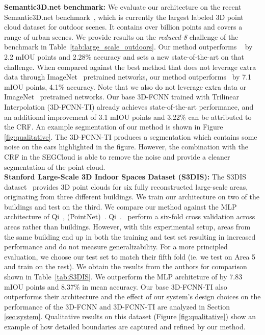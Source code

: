 \documentclass[10pt,twocolumn,letterpaper]{article}
\newcommand{\fccrf}[0]{CRF\xspace}
\newcommand{\ours}[0]{SEGCloud\xspace}
\newcommand{\threedfcnn}[0]{3D-FCNN\xspace}
\begin{document}
\textbf{Semantic3D.net benchmark:}
We evaluate our architecture on the recent Semantic3D.net benchmark~\cite{l3d}, which is currently the largest labeled 3D point cloud dataset for outdoor scenes. It contains over  billion points and covers a range of urban scenes. We provide results on the \textit{reduced-8} challenge of the benchmark in Table~\ref{tab:large_scale_outdoors}. Our method outperforms ~\cite{snapnet} by 2.2 mIOU points and 2.28\% accuracy and sets a new state-of-the-art on that challenge. When compared against the best method that does not leverage extra data through ImageNet~\cite{ILSVRC15} pretrained networks, our method outperforms~\cite{Hackel2016} by 7.1 mIOU points, 4.1\% accuracy. Note that we also do not leverage extra data or ImageNet~\cite{ILSVRC15} pretrained networks. Our base \threedfcnn trained with Trilinear Interpolation (\threedfcnn-TI) already achieves state-of-the-art performance, and an additional improvement of 3.1 mIOU points and 3.22\% can be attributed to the \fccrf. An example segmentation of our method is shown in Figure \ref{fig:qualitative}. The \threedfcnn-TI produces a segmentation which contains some noise on the cars highlighted in the figure. However, the combination with the \fccrf in the \ours is able to remove the noise and provide a cleaner segmentation of the point cloud.\\

\textbf{Stanford Large-Scale 3D Indoor Spaces Dataset (S3DIS): }The S3DIS dataset~\cite{Armeni2016} provides 3D point clouds for six fully reconstructed large-scale areas, originating from three different buildings. We train our architecture on two of the buildings and test on the third. We compare our method against the MLP architecture of Qi~\etal, (PointNet)~\cite{DBLP:journals/corr/QiSMG16}. Qi~\etal.~\cite{DBLP:journals/corr/QiSMG16} perform a six-fold cross validation across areas rather than buildings. However, with this experimental setup, areas from the same building end up in both the training and test set resulting in increased performance and do not measure generalizability. For a more principled evaluation, we choose our test set to match their fifth fold (ie. we test on Area 5 and train on the rest). We obtain the results from the authors for comparison shown in Table~\ref{tab:S3DIS}. We outperform the MLP architeture of \cite{DBLP:journals/corr/QiSMG16} by 7.83 mIOU points and 8.37\% in mean accuracy. Our base \threedfcnn-TI also outperforms their architecture and the effect of our system's design choices on the performance of the \threedfcnn and \threedfcnn-TI are analyzed in Section \ref{sec:system}. Qualitative results on this dataset (Figure \ref{fig:qualitative}) show an example of how detailed boundaries are captured and refined by our method. \\
\end{document}
